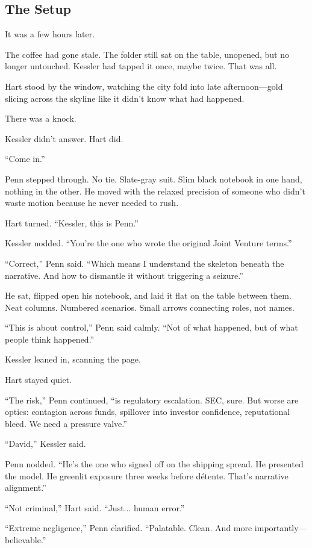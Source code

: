 
\subsection{The Setup}

It was a few hours later.

The coffee had gone stale. The folder still sat on the table, unopened, but no longer untouched. Kessler had tapped it once, maybe twice. That was all.

Hart stood by the window, watching the city fold into late afternoon—gold slicing across the skyline like it didn’t know what had happened.

There was a knock.

Kessler didn’t answer. Hart did.

“Come in.”

Penn stepped through. No tie. Slate-gray suit. Slim black notebook in one hand, nothing in the other. He moved with the relaxed precision of someone who didn’t waste motion because he never needed to rush.

Hart turned. “Kessler, this is Penn.”

Kessler nodded. “You’re the one who wrote the original Joint Venture terms.”

“Correct,” Penn said. “Which means I understand the skeleton beneath the narrative. And how to dismantle it without triggering a seizure.”

He sat, flipped open his notebook, and laid it flat on the table between them. Neat columns. Numbered scenarios. Small arrows connecting roles, not names.

“This is about control,” Penn said calmly. “Not of what happened, but of what people think happened.”

Kessler leaned in, scanning the page.

Hart stayed quiet.

“The risk,” Penn continued, “is regulatory escalation. SEC, sure. But worse are optics: contagion across funds, spillover into investor confidence, reputational bleed. We need a pressure valve.”

“David,” Kessler said.

Penn nodded. “He’s the one who signed off on the shipping spread. He presented the model. He greenlit exposure three weeks before détente. That’s narrative alignment.”

“Not criminal,” Hart said. “Just... human error.”

“Extreme negligence,” Penn clarified. “Palatable. Clean. And more importantly—believable.”

